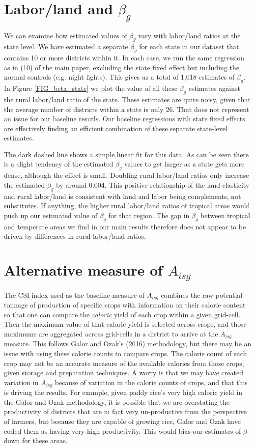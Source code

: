 \documentclass[11pt]{article}
\begin{document}
\section{Labor/land and $\beta_g$}
We can examine how estimated values of $\beta_g$ vary with labor/land ratios at the state level. We have estimated a separate $\beta_g$ for each state in our dataset that contains 10 or more districts within it. In each case, we run the same regression as in (10) of the main paper, excluding the state fixed effect but including the normal controls (e.g. night lights). This gives us a total of 1,018 estimates of $\beta_g$. In Figure \ref{FIG_beta_state} we plot the value of all these $\beta_g$ estimates against the rural labor/land ratio of the state. These estimates are quite noisy, given that the average number of districts within a state is only 26. That does not represent an issue for our baseline resutls. Our baseline regressions with state fixed effects are effectively finding an efficient combination of these separate state-level estimates. 

The dark dashed line shows a simple linear fit for this data. As can be seen there is a slight tendency of the estimated $\beta_g$ values to get larger as a state gets more dense, although the effect is small. Doubling rural labor/land ratios only increase the estimated $\beta_g$ by around 0.004. This positive relationship of the land elasticity and rural labor/land is consistent with land and labor being complements, not substitutes. If anything, the higher rural labor/land ratios of tropical areas would push up our estimated value of $\beta_g$ for that region. The gap in $\beta_g$ between tropical and temperate areas we find in our main results therefore does not appear to be driven by differences in rural labor/land ratios. 

\section{Alternative measure of $A_{isg}$}
The CSI index used as the baseline measure of $A_{isg}$ combines the raw potential tonnage of production of specific crops with information on their calorie content so that one can compare the \textit{caloric} yield of each crop within a given grid-cell. Then the maximum value of that caloric yield is selected across crops, and those maximums are aggregated across grid-cells in a district to arrive at the $A_{isg}$ measure. This follows Galor and Ozak's (2016) methodology, but there may be an issue with using these calorie counts to compare crops. The calorie count of each crop may not be an accurate measure of the available calories from those crops, given storage and preparation techniques. A worry is that we may have created variation in $A_{isg}$ because of variation in the calorie counts of crops, and that this is driving the results. For example, given paddy rice's very high caloric yield in the Galor and Ozak methodology, it is possible that we are overstating the productivity of districts that are in fact very un-productive from the perspective of farmers, but because they are capable of growing rice, Galor and Ozak have coded them as having very high productivity. This would bias our estimates of $\beta$ down for these areas. 
\end{document}
